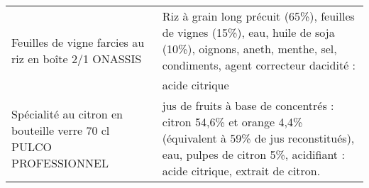 \begin{longtable}{p{5cm}p{10cm}}
                                                    Feuilles de vigne farcies au riz en boîte 2/1 ONASSIS &                                                                                                                                                                                                                                                                                                                                                                                                                                                                                                                                                                                                                                                                                                                                                                                                                                                                 Riz à grain long précuit (65\%), feuilles de vignes (15\%), eau, huile de soja (10\%), oignons, aneth, menthe, sel, condiments, agent correcteur dacidité : acide citrique \\
                                        Spécialité au citron en bouteille verre 70 cl PULCO PROFESSIONNEL &                                                                                                                                                                                                                                                                                                                                                                                                                                                                                                                                                                                                                                                                                                                                                                                                                                                       jus de fruits à base de concentrés : citron 54,6\% et orange 4,4\% (équivalent à 59\% de jus reconstitués), eau, pulpes de citron 5\%, acidifiant : acide citrique, extrait de citron. \\

\end{longtable}
